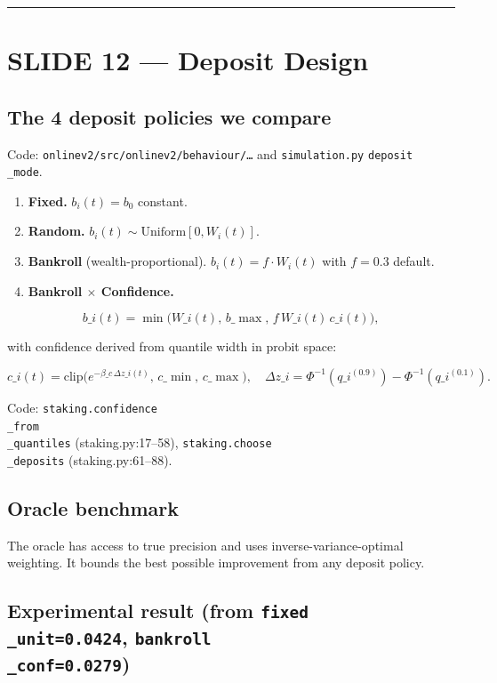 \documentclass[11pt]{article}
\begin{document}
\bigskip\hrule\bigskip

\section{SLIDE 12 --- Deposit Design}


\subsection{The 4 deposit policies we compare}


Code: \texttt{onlinev2/src/onlinev2/behaviour/\ldots{}} and \texttt{simulation.py} \texttt{deposit\\_mode}.

\begin{enumerate}
\item \textbf{Fixed.} $b_i(t) = b_0$ constant.
\item \textbf{Random.} $b_i(t) \sim \text{Uniform}[0, W_i(t)]$.
\item \textbf{Bankroll} (wealth-proportional). $b_i(t) = f \cdot W_i(t)$ with $f = 0.3$ default.
\item \textbf{Bankroll $\times$ Confidence.}
\end{enumerate}

$$
b\_i(t) = \min\!\bigl(W\_i(t),\, b\_{\max},\, f\, W\_i(t)\, c\_i(t)\bigr),
$$

with confidence derived from quantile width in probit space:

$$
c\_i(t) = \text{clip}\!\bigl(e^{-\beta\_c\,\Delta z\_i(t)},\, c\_{\min},\, c\_{\max}\bigr),\quad \Delta z\_i = \Phi^{-1}(q\_i^{(0.9)}) - \Phi^{-1}(q\_i^{(0.1)}).
$$

Code: \texttt{staking.confidence\\_from\\_quantiles} (staking.py:17--58), \texttt{staking.choose\\_deposits} (staking.py:61--88).

\subsection{Oracle benchmark}


The oracle has access to true precision and uses inverse-variance-optimal weighting. It bounds the best possible improvement from any deposit policy.

\subsection{Experimental result (from \texttt{fixed\\_unit=0.0424}, \texttt{bankroll\\_conf=0.0279})}
\end{document}
